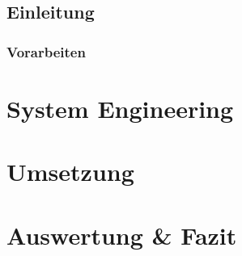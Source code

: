 \documentclass{report}
\begin{document}
\section{Einleitung}

\subsection{Vorarbeiten}\label{vorarbeiten}

\chapter{System Engineering}

\vspace{-4mm}

\chapter{Umsetzung}

\chapter{Auswertung \& Fazit}
%

\newpage
\setlength{\cftbeforelottitleskip}{0pt} %
\setlength{\cftafterlottitleskip}{15pt} %
\listoftables
{}  %

\renewcommand{\bibname}{Quellenverzeichnis}
\printbibliography[title={Quellenverzeichnis}]

\appendix

\end{document}
